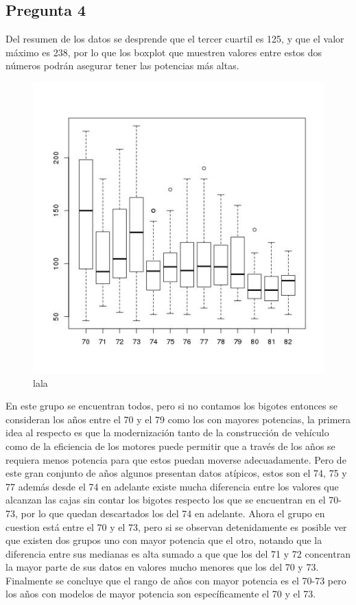 \documentclass[letter,10pt]{article}
\begin{document}
\subsection{Pregunta 4}
Del resumen de los datos se desprende que el tercer cuartil es 125, y que el valor máximo es 238, por lo que
los boxplot que muestren valores entre estos dos números podrán asegurar tener las potencias más altas.
\begin{figure}[h!]
    \centering
    \includegraphics[scale=0.5]{boxplot_horsepower_model_year.jpg}
    \caption{lala}
    \label{fig:lala}
\end{figure}

En este grupo se encuentran todos, pero si no contamos los bigotes entonces se consideran los años
entre el 70 y el 79 como los con mayores potencias, la primera idea al respecto es que la modernización tanto de la construcción
de vehículo como de la eficiencia de los motores puede permitir que a través de los años se requiera menos potencia para que estos
puedan moverse adecuadamente. Pero de este gran conjunto de años algunos presentan datos atípicos, estos son el 74, 75 y 77 además desde el 74 en adelante existe
mucha diferencia entre los valores que alcanzan las cajas sin contar los bigotes respecto los que se encuentran en el 70-73, por lo que quedan descartados los del 74 en adelante.
Ahora el grupo en cuestion está entre el 70 y el 73, pero si se observan detenidamente es posible ver que existen dos grupos uno con mayor potencia que el otro, 
notando que la diferencia entre sus medianas es alta sumado a que que los del 71 y 72
concentran la mayor parte de sus datos en valores mucho menores que los del 70 y 73.
Finalmente se concluye que el rango de años con mayor potencia es el 70-73 pero los años con modelos de mayor potencia son específicamente el 70 y el 73.
\end{document}

